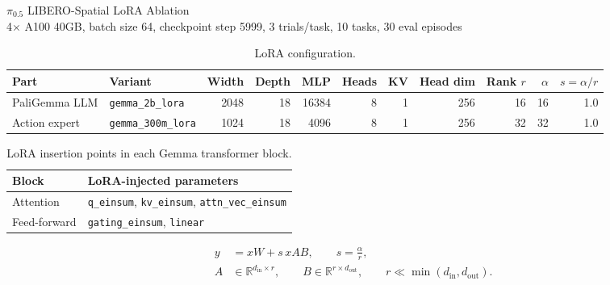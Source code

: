 \documentclass[10pt]{article}
\begin{document}
\begin{center}
{\Large $\pi_{0.5}$ LIBERO-Spatial LoRA Ablation}\\
\vspace{0.35em}
{\small 4$\times$ A100 40GB, batch size 64, checkpoint step 5999, 3 trials/task, 10 tasks, 30 eval episodes}
\end{center}


\begin{table}[h]
\centering
\caption{LoRA configuration.}
\label{tab:lora-config}
\begin{tabular}{l l r r r r r r r r r}
\toprule
Part & Variant & Width & Depth & MLP & Heads & KV & Head dim & Rank $r$ & $\alpha$ & $s=\alpha/r$ \\
\midrule
PaliGemma LLM & \texttt{gemma\_2b\_lora} & 2048 & 18 & 16384 & 8 & 1 & 256 & 16 & 16 & 1.0 \\
Action expert & \texttt{gemma\_300m\_lora} & 1024 & 18 & 4096 & 8 & 1 & 256 & 32 & 32 & 1.0 \\
\bottomrule
\end{tabular}
\end{table}

\begin{table}[h]
\centering
\caption{LoRA insertion points in each Gemma transformer block.}
\label{tab:lora-sites}
\begin{tabular}{l l}
\toprule
Block & LoRA-injected parameters \\
\midrule
Attention & \texttt{q\_einsum}, \texttt{kv\_einsum}, \texttt{attn\_vec\_einsum} \\
Feed-forward & \texttt{gating\_einsum}, \texttt{linear} \\
\bottomrule
\end{tabular}
\end{table}

\begin{align}
y &= xW + s\,xAB, \qquad s=\frac{\alpha}{r}, \\
A &\in \mathbb{R}^{d_{\mathrm{in}}\times r}, \qquad
B \in \mathbb{R}^{r\times d_{\mathrm{out}}}, \qquad
r \ll \min(d_{\mathrm{in}},d_{\mathrm{out}}).
\end{align}
\end{document}
